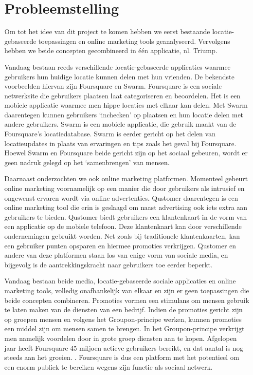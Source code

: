 \chapter{Probleemstelling}
Om tot het idee van dit project te komen hebben we eerst bestaande locatie-gebaseerde toepassingen en online marketing tools geanalyseerd. Vervolgens hebben we beide concepten gecombineerd in één applicatie, nl. Triump.

Vandaag bestaan reeds verschillende locatie-gebaseerde applicaties waarmee gebruikers hun huidige locatie kunnen delen met hun vrienden. 
De bekendste voorbeelden hiervan zijn Foursquare\cite{foursquare} en Swarm\cite{swarm}.
Foursquare is een sociale netwerksite die gebruikers plaatsen laat categoriseren en beoordelen.
Het is een mobiele applicatie waarmee men hippe locaties met elkaar kan delen. Met Swarm daarentegen kunnen gebruikers `inchecken' op plaatsen en hun locatie delen met andere gebruikers. Swarm is een mobiele applicatie, die gebruik maakt van de Foursquare's locatiedatabase. Swarm is eerder gericht op het delen van locatieupdates in plaats van ervaringen en tips zoals het geval bij Foursquare.
Hoewel Swarm en Foursquare beide gericht zijn op het sociaal gebeuren, wordt er geen nadruk gelegd op het `samenbrengen' van mensen. 

Daarnaast onderzochten we ook online marketing platformen. Momenteel gebeurt online marketing voornamelijk op een manier die door gebruikers als intrusief en ongewenst ervaren wordt via online advertenties. Qustomer\cite{qustomer} daarentegen is een online marketing tool die erin is geslaagd om naast advertising ook iets extra aan gebruikers te bieden. Qustomer biedt gebruikers een klantenkaart in de vorm van een applicatie op de mobiele telefoon. Deze klantenkaart kan door verschillende ondernemingen gebruikt worden. Net zoals bij traditionele klantenkaarten, kan een gebruiker punten opsparen en hiermee promoties verkrijgen. Qustomer en andere van deze platformen staan los van enige vorm van sociale media, en bijgevolg is de aantrekkingskracht naar gebruikers toe eerder beperkt.

Vandaag bestaan beide media, locatie-gebaseerde sociale applicaties en online marketing tools, volledig onafhankelijk van elkaar en zijn er geen toepassingen die beide concepten combineren. 
Promoties vormen een stimulans om mensen gebruik te laten maken van de diensten van een bedrijf. Indien de promoties gericht zijn op groepen mensen en volgens het Groupon-principe werken, kunnen promoties een middel zijn om mensen samen te brengen.
In het Groupon-principe verkrijgt men namelijk voordelen door in grote groep diensten aan te kopen.
Afgelopen jaar heeft Foursquare 45 miljoen actieve gebruikers bereikt, en dat aantal is nog steeds aan het groeien. \cite{users}. Foursquare is dus een platform met het potentieel om een enorm publiek te bereiken wegens zijn functie als sociaal netwerk. 

